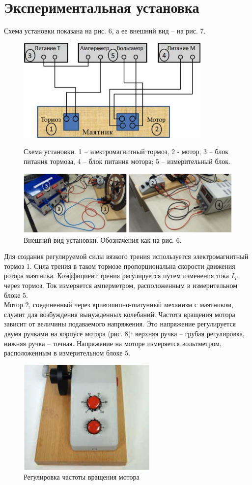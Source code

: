 \documentclass[a4paper]{article}
\begin{document}
\section{\textbf{Экспериментальная установка}}
Схема установки показана на рис. 6, а ее внешний вид – на
рис. 7.
\begin{figure}[H]
\begin{center}
\includegraphics[scale=0.5]{pick_6.png}
\caption{Схема установки. 1 – электромагнитный тормоз, 2 - мотор, 3
– блок питания тормоза, 4 – блок питания мотора; 5 –
измерительный блок.}
\includegraphics[scale=0.5]{pick_7.png}
\caption{Внешний вид установки. Обозначения как на рис. 6.}
\end{center}
\end{figure}
Для создания регулируемой силы вязкого трения используется
электромагнитный тормоз 1. Сила трения в таком тормозе пропорциональна скорости движения ротора маятника. Коэффициент
трения регулируется путем изменения тока $I_T$ через тормоз. Ток измеряется амперметром, расположенным в измерительном блоке 5.\\
Мотор 2, соединенный через кривошипно-шатунный механизм
с маятником, служит для возбуждения вынужденных колебаний.
Частота вращения мотора зависит от величины подаваемого напряжения. Это напряжение регулируется двумя ручками на корпусе мотора (рис. 8): верхняя ручка – грубая регулировка, нижняя ручка – точная. Напряжение на моторе измеряется вольтметром, расположенным в измерительном блоке 5.
\begin{figure}[H]
\begin{center}
\includegraphics[scale=0.5]{pick_8.png}
\caption{Регулировка частоты вращения мотора}
\end{center}
\end{figure}
\end{document}
